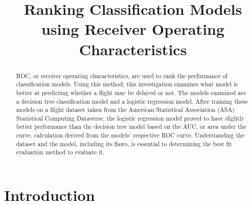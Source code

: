 \documentclass[journal]{IEEEtran}
\begin{document}
\setlength{\emergencystretch}{12pt}
\setlength{\parindent}{10pt}



\lstset{style=mystyle}

\title{Ranking Classification Models using Receiver Operating Characteristics}

\author{
}

\maketitle

\begin{abstract}
\label{log:abstract}

ROC, or receiver operating characteristics, are used to rank the performance of classification models. Using this method, this investigation examines what model is better at predicting whether a flight may be delayed or not. The models examined are a decision tree classification model and a logistic regression model. After training these models on a flight dataset taken from the American Statistical Association (ASA) Statistical Computing Dataverse, the logistic regression model proved to have slightly better performance than the decision tree model based on the AUC, or area under the curve, calculation derived from the models' respective ROC curve. Understanding the dataset and the model, including its flaws, is essential to determining the best fit evaluation method to evaluate it. 

\end{abstract}

\section{Introduction}
\label{sec:intro}
\end{document}
